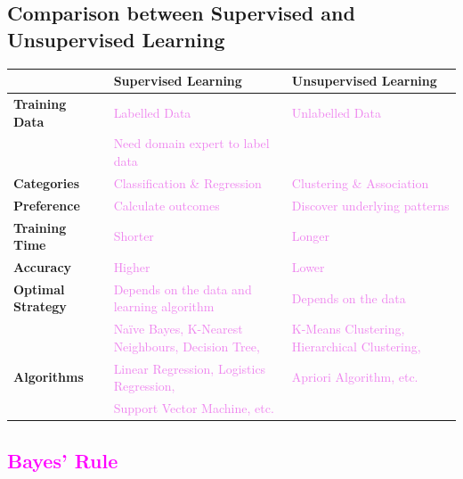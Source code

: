 \documentclass{book}
\begin{document}
\subsection{Comparison between Supervised and Unsupervised Learning}
\begin{center}
    \begin{tabular}{|m{2.9cm}|m{7.5cm}|m{6.5cm}|}
        \hline
        \rowcolor{lightblue}
        & \textbf{Supervised Learning} & \textbf{Unsupervised Learning} \\
        \hline
        \textbf{Training Data} & \textcolor{violet}{Labelled Data} & \textcolor{violet}{Unlabelled Data} \\
         & \textcolor{violet}{Need domain expert to label data} & \\
        \hline
        \textbf{Categories} & \textcolor{violet}{Classification \& Regression} & \textcolor{violet}{Clustering \& Association} \\
        \hline
        \textbf{Preference} & \textcolor{violet}{Calculate outcomes} & \textcolor{violet}{Discover underlying patterns} \\
        \hline
        \textbf{Training Time} & \textcolor{violet}{Shorter} & \textcolor{violet}{Longer} \\
        \hline
        \textbf{Accuracy} & \textcolor{violet}{Higher} & \textcolor{violet}{Lower} \\
        \hline
        \textbf{Optimal Strategy} & \textcolor{violet}{Depends on the data and learning algorithm} & \textcolor{violet}{Depends on the data} \\
        \hline
        & \textcolor{violet}{Naïve Bayes, K-Nearest Neighbours, Decision Tree, } & \textcolor{violet}{K-Means Clustering, Hierarchical Clustering, } \\
        \textbf{Algorithms} & \textcolor{violet}{Linear Regression, Logistics Regression, } & \textcolor{violet}{Apriori Algorithm, etc.} \\
        & \textcolor{violet}{Support Vector Machine, etc.} & \\
        \hline
    \end{tabular}
\end{center}
\textcolor{magenta}{\section{\textbf{Bayes' Rule}}}
\end{document}
